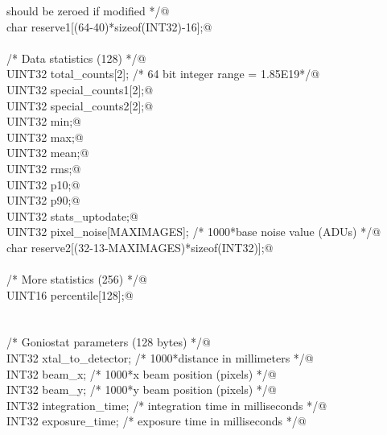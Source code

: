 \documentclass[10pt,a4paper,twoside,notitlepage]{article}
\begin{document}
\begin{flushleft}
\begin{minipage}{\linewidth}
\begin{list}{}{}
\mbox{}\verb@                                              should be zeroed if modified */@\\
\mbox{}\verb@         char reserve1[(64-40)*sizeof(INT32)-16];@\\
\mbox{}\verb@@\\
\mbox{}\verb@         /* Data statistics (128) */@\\
\mbox{}\verb@         UINT32        total_counts[2];  /* 64 bit integer range = 1.85E19*/@\\
\mbox{}\verb@         UINT32        special_counts1[2];@\\
\mbox{}\verb@         UINT32        special_counts2[2];@\\
\mbox{}\verb@         UINT32        min;@\\
\mbox{}\verb@         UINT32        max;@\\
\mbox{}\verb@         UINT32        mean;@\\
\mbox{}\verb@         UINT32        rms;@\\
\mbox{}\verb@         UINT32        p10;@\\
\mbox{}\verb@         UINT32        p90;@\\
\mbox{}\verb@         UINT32        stats_uptodate;@\\
\mbox{}\verb@         UINT32        pixel_noise[MAXIMAGES]; /* 1000*base noise value (ADUs) */@\\
\mbox{}\verb@         char reserve2[(32-13-MAXIMAGES)*sizeof(INT32)];@\\
\mbox{}\verb@@\\
\mbox{}\verb@         /* More statistics (256) */@\\
\mbox{}\verb@         UINT16 percentile[128];@\\
\mbox{}\verb@@\\
\mbox{}\verb@@\\
\mbox{}\verb@         /* Goniostat parameters (128 bytes) */@\\
\mbox{}\verb@         INT32 xtal_to_detector;  /* 1000*distance in millimeters */@\\
\mbox{}\verb@         INT32 beam_x;            /* 1000*x beam position (pixels) */@\\
\mbox{}\verb@         INT32 beam_y;            /* 1000*y beam position (pixels) */@\\
\mbox{}\verb@         INT32 integration_time;  /* integration time in  milliseconds */@\\
\mbox{}\verb@         INT32 exposure_time;     /* exposure time in milliseconds */@\\

\end{list}
\end{minipage}
\end{flushleft}
\end{document}
